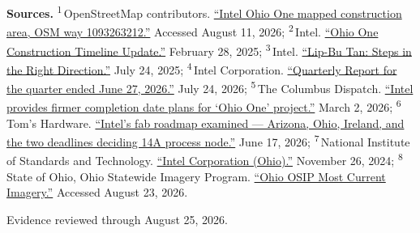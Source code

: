 \begin{minipage}[t][0.90\textheight][t]{\textwidth}
{\sffamily\scriptsize\setlength{\emergencystretch}{1.5em}\textbf{Sources.} \textsuperscript{1}\,OpenStreetMap contributors. \href{\detokenize{https://www.openstreetmap.org/way/1093263212}}{\enquote{Intel Ohio One mapped construction area, OSM way 1093263212.}} Accessed August 11, 2026; \textsuperscript{2}\,Intel. \href{\detokenize{https://web.archive.org/web/20260824065634/https://newsroom.intel.com/corporate/ohio-one-construction-timeline-update}}{\enquote{Ohio One Construction Timeline Update.}} February 28, 2025; \textsuperscript{3}\,Intel. \href{\detokenize{https://web.archive.org/web/20260711062821/https://newsroom.intel.com/corporate/lip-bu-tan-steps-in-the-right-direction}}{\enquote{Lip-Bu Tan: Steps in the Right Direction.}} July 24, 2025; \textsuperscript{4}\,Intel Corporation. \href{\detokenize{https://www.intc.com/filings-reports/all-sec-filings/content/0000050863-26-000157/intc-20260627.htm}}{\enquote{Quarterly Report for the quarter ended June 27, 2026.}} July 24, 2026; \textsuperscript{5}\,The Columbus Dispatch. \href{\detokenize{https://www.dispatch.com/story/business/information-technology/2026/03/02/intel-provides-firmer-completion-date-plans-for-ohio-one-project-chip-factory/88943609007/}}{\enquote{Intel provides firmer completion date plans for `Ohio One' project.}} March 2, 2026; \textsuperscript{6}\,Tom's Hardware. \href{\detokenize{https://www.tomshardware.com/tech-industry/semiconductors/intels-fab-roadmap-examined}}{\enquote{Intel's fab roadmap examined --- Arizona, Ohio, Ireland, and the two deadlines deciding 14A process node.}} June 17, 2026; \textsuperscript{7}\,National Institute of Standards and Technology. \href{\detokenize{https://www.nist.gov/chips/intel-corporation-ohio-new-albany}}{\enquote{Intel Corporation (Ohio).}} November 26, 2024; \textsuperscript{8}\,State of Ohio, Ohio Statewide Imagery Program. \href{\detokenize{https://maps.ohio.gov/image/rest/services/osip_most_current/ImageServer}}{\enquote{Ohio OSIP Most Current Imagery.}} Accessed August 23, 2026.\par}
\vfill
\noindent{\color{hairline}\rule{\linewidth}{0.4pt}}\par\smallskip
{\sffamily\scriptsize\color{black!58} Evidence reviewed through August 25, 2026.\par}
\end{minipage}
\clearpage
